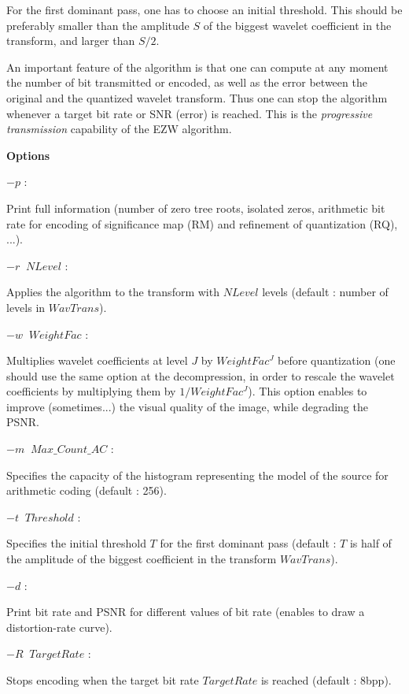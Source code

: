 For the first dominant pass, one has to choose an initial threshold. 
This should be preferably smaller than the amplitude $S$ of the biggest 
wavelet coefficient in the transform, and larger than $S/2$. 

An important feature of the algorithm is that one can compute at any moment 
the number of bit transmitted or encoded, as well as the error between 
the original and the quantized wavelet transform. Thus one can stop 
the algorithm whenever a target bit rate or SNR (error) is reached. 
This is the {\em progressive transmission} capability of the EZW algorithm. 
\newline 

{\bf Options} 
\newline 

$-p$ : \parbox[t]{15.2cm}{Print full information (number of zero tree roots, 
isolated zeros, arithmetic bit rate for encoding of significance map (RM) 
and refinement of quantization (RQ), ...).}
\newline 

$-r \;\; NLevel$ :  \parbox[t]{12.9cm}{Applies the algorithm 
to the transform with $NLevel$ levels (default : number of levels 
in $WavTrans$). }
\newline 

$-w \;\; WeightFac$ :  \parbox[t]{13.0cm}{Multiplies wavelet coefficients 
at level $J$ by $WeightFac^J$ before quantization (one should use the same 
option at the decompression, in order to rescale the wavelet coefficients 
by multiplying them by $1/WeightFac^J$). This option enables to improve 
(sometimes...) the visual quality of the image, while degrading the PSNR. }
\newline 

$-m \;\; Max\mbox{\_}Count\mbox{\_}AC$ : \parbox[t]{12.1cm}{Specifies 
the capacity of the histogram representing the model of the source 
for arithmetic coding (default : 256).} 
\newline 

$-t \;\; Threshold$ : \parbox[t]{13.3cm}{Specifies the initial threshold $T$ 
for the first dominant pass (default : $T$ is half of the amplitude 
of the biggest coefficient in the transform $WavTrans$). }
\newline 

$-d$ : \parbox[t]{15.2cm}{Print bit rate and PSNR for different values of 
bit rate (enables to draw a distortion-rate curve). }
\newline 

$-R \;\; TargetRate$ : \parbox[t]{13.0cm}{Stops encoding when the target bit 
rate $TargetRate$ is reached (default : 8bpp). }
\newline 

